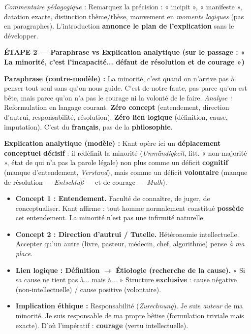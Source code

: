 \documentclass[11pt]{article}
\newcommand{\cle}[1]{{\popxbold\color{popdark}#1}}
\begin{document}
\begin{exoresolu}
\textit{Commentaire pédagogique :} Remarquez la précision : « incipit », « manifeste », datation exacte, distinction thème/thèse, mouvement en \emph{moments logiques} (pas en paragraphes). L'introduction \textbf{annonce le plan de l'explication} sans le développer.

\vspace{0.5cm}
\textbf{ÉTAPE 2 — Paraphrase vs Explication analytique (sur le passage : « La minorité, c'est l'incapacité... défaut de résolution et de courage »)}

\guillemotleft \textbf{Paraphrase (contre-modèle) :} \guillemotleft La minorité, c'est quand on n'arrive pas à penser tout seul sans qu'on nous guide. C'est de notre faute, pas parce qu'on est bête, mais parce qu'on n'a pas le courage ni la volonté de le faire. \guillemotright
\textit{Analyse :} Reformulation en langage courant. \textbf{Zéro concept} (entendement, direction d'autrui, responsabilité, résolution). \textbf{Zéro lien logique} (définition, cause, imputation). C'est du \textbf{français}, pas de la \textbf{philosophie}.

\textbf{Explication analytique (modèle) :} \guillemotleft Kant opère ici un \textbf{déplacement conceptuel décisif} : il redéfinit la minorité (\emph{Unmündigkeit}, litt. « non-majorité », état de qui n'a pas la parole légale) non plus comme un déficit \textbf{cognitif} (manque d'\cle{entendement}, \emph{Verstand}), mais comme un déficit \textbf{volontaire} (manque de \cle{résolution} — \emph{Entschluß} — et de \cle{courage} — \emph{Muth}).
\begin{itemize}
    \item \textbf{Concept 1 : Entendement.} Faculté de connaître, de juger, de conceptualiser. Kant affirme : tout homme normalement constitué \textbf{possède} cet entendement. La minorité n'est pas une infirmité naturelle.
    \item \textbf{Concept 2 : Direction d'autrui / Tutelle.} Hétéronomie intellectuelle. Accepter qu'un autre (livre, pasteur, médecin, chef, algorithme) pense \emph{à ma place}.
    \item \textbf{Lien logique : Définition $\rightarrow$ Étio\l ogie (recherche de la cause).} « Si sa cause ne tient pas à... mais à... » Structure \textbf{exclusive} : cause négative (non-intellectuelle) / cause positive (volontaire).
    \item \textbf{Implication éthique :} \cle{Responsabilité} (\emph{Zurechnung}). Je suis \emph{auteur} de ma minorité. \guillemotleft Je suis responsable de ma propre bêtise \guillemotright (formulation triviale mais exacte). D'où l'impératif : \textbf{courage} (vertu intellectuelle).
\end{itemize} \guillemotright


\end{exoresolu}
\end{document}
